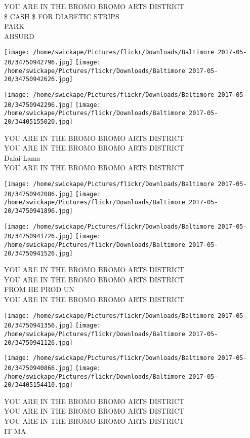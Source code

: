 \documentclass[10pt,letterpaper]{article}
\begin{document}
YOU ARE IN THE BROMO BROMO ARTS DISTRICT\\
\$ CASH \$ FOR DIABETIC STRIPS\\
PARK\\
ABSURD
\pagebreak

\texttt{[image: /home/swickape/Pictures/flickr/Downloads/Baltimore 2017-05-20/34750942796.jpg]}
\texttt{[image: /home/swickape/Pictures/flickr/Downloads/Baltimore 2017-05-20/34750942626.jpg]}

\texttt{[image: /home/swickape/Pictures/flickr/Downloads/Baltimore 2017-05-20/34750942296.jpg]}
\texttt{[image: /home/swickape/Pictures/flickr/Downloads/Baltimore 2017-05-20/34405155020.jpg]}

YOU ARE IN THE BROMO BROMO ARTS DISTRICT\\
YOU ARE IN THE BROMO BROMO ARTS DISTRICT\\
Dalai Lama\\
YOU ARE IN THE BROMO BROMO ARTS DISTRICT
\pagebreak

\texttt{[image: /home/swickape/Pictures/flickr/Downloads/Baltimore 2017-05-20/34750942086.jpg]}
\texttt{[image: /home/swickape/Pictures/flickr/Downloads/Baltimore 2017-05-20/34750941896.jpg]}

\texttt{[image: /home/swickape/Pictures/flickr/Downloads/Baltimore 2017-05-20/34750941726.jpg]}
\texttt{[image: /home/swickape/Pictures/flickr/Downloads/Baltimore 2017-05-20/34750941526.jpg]}

YOU ARE IN THE BROMO BROMO ARTS DISTRICT\\
YOU ARE IN THE BROMO BROMO ARTS DISTRICT\\
FROM HE PROD UN\\
YOU ARE IN THE BROMO BROMO ARTS DISTRICT
\pagebreak

\texttt{[image: /home/swickape/Pictures/flickr/Downloads/Baltimore 2017-05-20/34750941356.jpg]}
\texttt{[image: /home/swickape/Pictures/flickr/Downloads/Baltimore 2017-05-20/34750941126.jpg]}

\texttt{[image: /home/swickape/Pictures/flickr/Downloads/Baltimore 2017-05-20/34750940866.jpg]}
\texttt{[image: /home/swickape/Pictures/flickr/Downloads/Baltimore 2017-05-20/34405154410.jpg]}

YOU ARE IN THE BROMO BROMO ARTS DISTRICT\\
YOU ARE IN THE BROMO BROMO ARTS DISTRICT\\
YOU ARE IN THE BROMO BROMO ARTS DISTRICT\\
IT MA
\pagebreak
\end{document}
